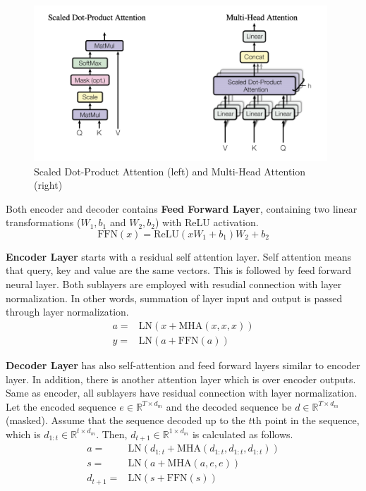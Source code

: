 \begin{figure}
	\centering
	\includegraphics[width=0.98\textwidth]{figures/ml_theory/att.png}
	\caption{Scaled Dot-Product Attention (left) and Multi-Head Attention (right)~\cite{vaswani_attention_2017}}
	\label{fig:att_and_mha}
\end{figure}

Both encoder and decoder contains \textbf{Feed Forward Layer}, containing two linear transformations ($W_1, b_1$ and $W_2, b_2$) with ReLU activation.
\begin{equation}
\mathrm{FFN}(x) = \text{ReLU}(x W_1 + b_1) W_2 + b_2
\end{equation}

\textbf{Encoder Layer} starts with a residual self attention layer. 
Self attention means that query, key and value are the same vectors. 
This is followed by feed forward neural layer. 
Both sublayers are employed with resudial connection with layer normalization.
In other words, summation of layer input and output is passed through layer normalization. 
\begin{equation}
\begin{split}
a = & \mathrm{LN}(x + \mathrm{MHA}(x,x,x)) \\
y = & \mathrm{LN}(a + \mathrm{FFN}(a))
\end{split}
\end{equation}

\textbf{Decoder Layer} has also self-attention and feed forward layers similar to encoder layer. 
In addition, there is another attention layer which is over encoder outputs. 
Same as encoder, all sublayers have residual connection with layer normalization. 
Let the encoded sequence $e \in \mathbb{R}^{T \times d_m}$ and the decoded sequence be $d \in \mathbb{R}^{T \times d_m}$ (masked). 
Assume that the sequence decoded up to the $t$th point in the sequence, which is $d_{1:t} \in \mathbb{R}^{t \times d_m}$.
Then, $d_{t+1} \in \mathbb{R}^{1 \times d_m}$ is calculated as follows. 
\begin{equation}
\begin{split}
a = & \mathrm{LN}(d_{1:t}+\mathrm{MHA}(d_{1:t},d_{1:t},d_{1:t})) \\
s = & \mathrm{LN}(a + \mathrm{MHA}(a,e,e)) \\
d_{t+1} = & \mathrm{LN}(s+ \mathrm{FFN}(s))
\end{split}
\end{equation}

